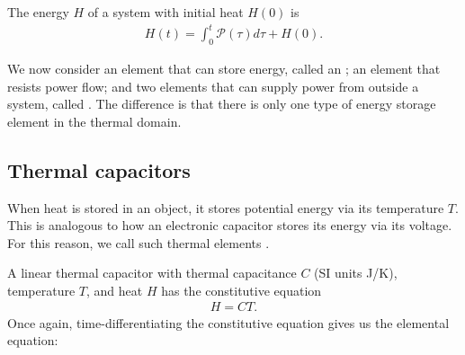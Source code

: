 \documentclass[dynamic_systems.tex]{subfiles}
\begin{document}
The  energy $H$ of a system with initial heat $H(0)$ is
\begin{align}
	H(t) = \int_0^t \mathcal{P}(\tau) d\tau + H(0).
\end{align}

We now consider an element that can store energy, called an ; an element that resists power flow; and two elements that can supply power from outside a system, called .
The  difference is that there is only one type of energy storage element in the thermal domain.

\subsection{Thermal capacitors}
\tags{}

When heat is stored in an object, it stores potential energy via its temperature $T$.
This is analogous to how an electronic capacitor stores its energy via its voltage.
For this reason, we call such thermal elements .

A linear thermal capacitor with thermal capacitance $C$ (SI units J/K), temperature $T$, and heat $H$ has the constitutive equation
\begin{align}
	H = C T.
\end{align}
Once again, time-differentiating the constitutive equation gives us the elemental equation:
\end{document}
